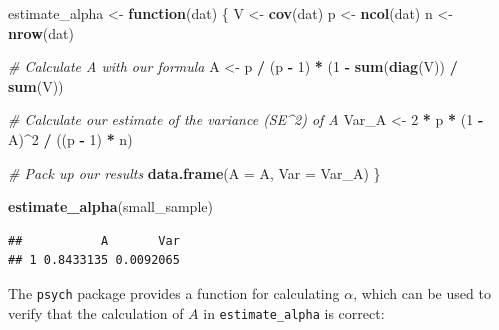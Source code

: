 \documentclass[
]{book}
\newenvironment{Shaded}{\begin{snugshade}}{\end{snugshade}}
\newcommand{\AttributeTok}[1]{\textcolor[rgb]{0.13,0.29,0.53}{#1}}
\newcommand{\CommentTok}[1]{\textcolor[rgb]{0.56,0.35,0.01}{\textit{#1}}}
\newcommand{\ControlFlowTok}[1]{\textcolor[rgb]{0.13,0.29,0.53}{\textbf{#1}}}
\newcommand{\DecValTok}[1]{\textcolor[rgb]{0.00,0.00,0.81}{#1}}
\newcommand{\FunctionTok}[1]{\textcolor[rgb]{0.13,0.29,0.53}{\textbf{#1}}}
\newcommand{\NormalTok}[1]{#1}
\newcommand{\OtherTok}[1]{\textcolor[rgb]{0.56,0.35,0.01}{#1}}
\newcommand{\SpecialCharTok}[1]{\textcolor[rgb]{0.81,0.36,0.00}{\textbf{#1}}}
\begin{document}
\begin{Shaded}
\begin{Highlighting}[]
\NormalTok{estimate\_alpha }\OtherTok{\textless{}{-}} \ControlFlowTok{function}\NormalTok{(dat) \{}
\NormalTok{  V }\OtherTok{\textless{}{-}} \FunctionTok{cov}\NormalTok{(dat)}
\NormalTok{  p }\OtherTok{\textless{}{-}} \FunctionTok{ncol}\NormalTok{(dat)}
\NormalTok{  n }\OtherTok{\textless{}{-}} \FunctionTok{nrow}\NormalTok{(dat)}
  
  \CommentTok{\# Calculate A with our formula}
\NormalTok{  A }\OtherTok{\textless{}{-}}\NormalTok{ p }\SpecialCharTok{/}\NormalTok{ (p }\SpecialCharTok{{-}} \DecValTok{1}\NormalTok{) }\SpecialCharTok{*}\NormalTok{ (}\DecValTok{1} \SpecialCharTok{{-}} \FunctionTok{sum}\NormalTok{(}\FunctionTok{diag}\NormalTok{(V)) }\SpecialCharTok{/} \FunctionTok{sum}\NormalTok{(V))}
  
  \CommentTok{\# Calculate our estimate of the variance (SE\^{}2) of A}
\NormalTok{  Var\_A }\OtherTok{\textless{}{-}} \DecValTok{2} \SpecialCharTok{*}\NormalTok{ p }\SpecialCharTok{*}\NormalTok{ (}\DecValTok{1} \SpecialCharTok{{-}}\NormalTok{ A)}\SpecialCharTok{\^{}}\DecValTok{2} \SpecialCharTok{/}\NormalTok{ ((p }\SpecialCharTok{{-}} \DecValTok{1}\NormalTok{) }\SpecialCharTok{*}\NormalTok{ n)}
  
  \CommentTok{\# Pack up our results}
  \FunctionTok{data.frame}\NormalTok{(}\AttributeTok{A =}\NormalTok{ A, }\AttributeTok{Var =}\NormalTok{ Var\_A)}
\NormalTok{\}}

\FunctionTok{estimate\_alpha}\NormalTok{(small\_sample)}
\end{Highlighting}
\end{Shaded}

\begin{verbatim}
##           A       Var
## 1 0.8433135 0.0092065
\end{verbatim}

The \texttt{psych} package provides a function for calculating \(\alpha\), which can be used to verify that the calculation of \(A\) in \texttt{estimate\_alpha} is correct:

\begin{Shaded}
\end{Shaded}
\end{document}
